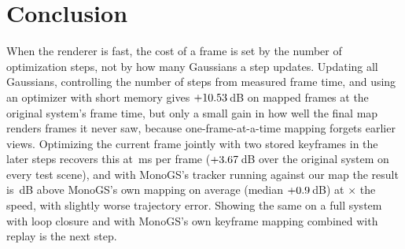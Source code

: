 \documentclass[10pt,twocolumn,letterpaper]{article}
\begin{document}
\section{Conclusion}
When the renderer is fast, the cost of a frame is set by the number of optimization steps, not by how many Gaussians a step updates. Updating all Gaussians, controlling the number of steps from measured frame time, and using an optimizer with short memory gives $+10.53$\,dB on mapped frames at the original system's frame time, but only a small gain in how well the final map renders frames it never saw, because one-frame-at-a-time mapping forgets earlier views. Optimizing the current frame jointly with two stored keyframes in the later steps recovers this at \engMsKThreeJr\,ms per frame ($+3.67$\,dB over the original system on every test scene), and with MonoGS's tracker running against our map the result is \engHybGapKThreeJr\,dB above MonoGS's own mapping on average (median $+0.9$\,dB) at \engHybSpeedup$\times$ the speed, with slightly worse trajectory error. Showing the same on a full system with loop closure and with MonoGS's own keyframe mapping combined with replay is the next step.

{\small


}
\end{document}
